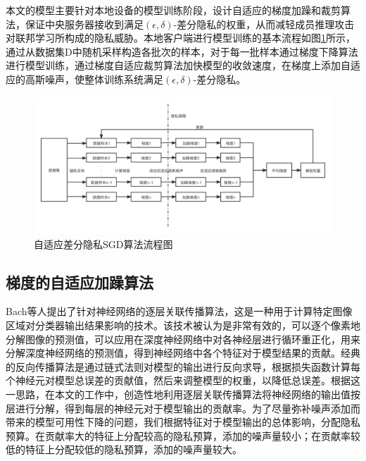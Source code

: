 本文的模型主要针对本地设备的模型训练阶段，设计自适应的梯度加躁和裁剪算法，保证中央服务器接收到满足$(\epsilon, \delta)$-差分隐私的权重，从而减轻成员推理攻击对联邦学习所构成的隐私威胁。本地客户端进行模型训练的基本流程如图\ref{fig:自适应差分隐私SGD算法流程图}所示，通过从数据集D中随机采样构造各批次的样本，对于每一批样本通过梯度下降算法进行模型训练，通过梯度自适应裁剪算法加快模型的收敛速度，在梯度上添加自适应的高斯噪声，使整体训练系统满足$(\epsilon, \delta)$-差分隐私。

\begin{figure}[!hbt]
\centering
	\includegraphics[scale=0.2]{fig2/C3/自适应差分隐私流程图}%
	\caption{自适应差分隐私SGD算法流程图}
	\label{fig:自适应差分隐私SGD算法流程图}	
\end{figure}

\subsection{梯度的自适应加躁算法}

Bach等人提出了针对神经网络的逐层关联传播算法，这是一种用于计算特定图像区域对分类器输出结果影响的技术。该技术被认为是非常有效的，可以逐个像素地分解图像的预测值，可以应用在深度神经网络中对各神经层进行循环重正化，用来分解深度神经网络的预测值，得到神经网络中各个特征对于模型结果的贡献。经典的反向传播算法是通过链式法则对模型的输出进行反向求导，根据损失函数计算每个神经元对模型总误差的贡献值，然后来调整模型的权重，以降低总误差。根据这一思路，在本文的工作中，创造性地利用逐层关联传播算法将神经网络的输出值按层进行分解，得到每层的神经元对于模型输出的贡献率。为了尽量弥补噪声添加而带来的模型可用性下降的问题，我们根据特征对于模型输出的总体影响，分配隐私预算。在贡献率大的特征上分配较高的隐私预算，添加的噪声量较小；在贡献率较低的特征上分配较低的隐私预算，添加的噪声量较大。

